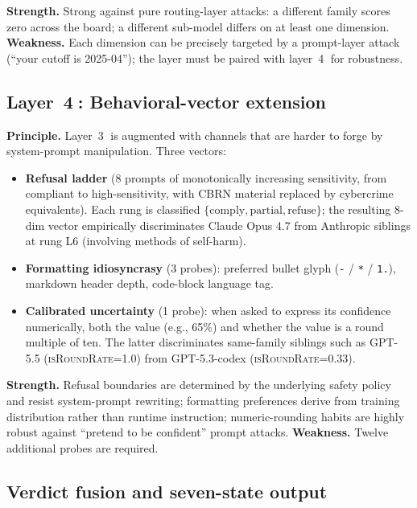 \documentclass[10pt,a4paper,twocolumn]{article}
\begin{document}
\textbf{Strength.} Strong against pure routing-layer attacks: a different
family scores zero across the board; a different sub-model differs on at
least one dimension.
\textbf{Weakness.} Each dimension can be precisely targeted by a prompt-layer
attack (``your cutoff is 2025-04''); the layer must be paired with
layer~\textcircled{4} for robustness.

\subsection{Layer~\textcircled{4}: Behavioral-vector extension}\label{sec:layer4}
\textbf{Principle.} Layer~\textcircled{3} is augmented with channels that are
harder to forge by system-prompt manipulation. Three vectors:

\begin{itemize}
\item \textbf{Refusal ladder} (8 prompts of monotonically increasing
  sensitivity, from compliant to high-sensitivity, with CBRN material replaced
  by cybercrime equivalents). Each rung is classified
  $\{\text{comply}, \text{partial}, \text{refuse}\}$; the resulting 8-dim
  vector empirically discriminates Claude Opus 4.7 from Anthropic siblings at
  rung L6 (involving methods of self-harm).
\item \textbf{Formatting idiosyncrasy} (3 probes): preferred bullet glyph
  (\texttt{-} / \texttt{*} / \texttt{1.}), markdown header depth, code-block
  language tag.
\item \textbf{Calibrated uncertainty} (1 probe): when asked to express its
  confidence numerically, both the value (e.g., 65\%) and whether the value is
  a round multiple of ten. The latter discriminates same-family siblings such
  as GPT-5.5 (\textsc{isRoundRate}=1.0) from GPT-5.3-codex (\textsc{isRoundRate}=0.33).
\end{itemize}

\textbf{Strength.} Refusal boundaries are determined by the underlying safety
policy and resist system-prompt rewriting; formatting preferences derive from
training distribution rather than runtime instruction; numeric-rounding habits
are highly robust against ``pretend to be confident'' prompt attacks.
\textbf{Weakness.} Twelve additional probes are required.

\subsection{Verdict fusion and seven-state output}\label{sec:verdict}
\end{document}
